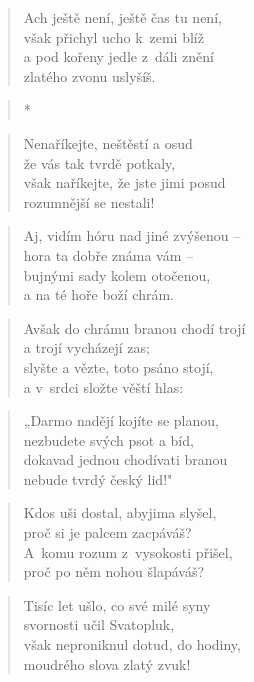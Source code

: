 \begin{verse}
Ach ještě není, ještě čas tu není, \\
však přichyl ucho k~zemi blíž \\
a pod kořeny jedle z~dáli znění \\
zlatého zvonu uslyšíš.
\end{verse}

\begin{verse}
*
\end{verse}

\begin{verse}
Nenaříkejte, neštěstí a osud \\
že vás tak tvrdě potkaly, \\
však naříkejte, že jste jimi posud \\
rozumnější se nestali!
\end{verse}

\begin{verse}
Aj, vidím hóru nad jiné zvýšenou -- \\
hora ta dobře známa vám -- \\
bujnými sady kolem otočenou, \\
a na té hoře boží chrám.
\end{verse}

\begin{verse}
Avšak do chrámu branou chodí trojí \\
a trojí vycházejí zas; \\
slyšte a vězte, toto psáno stojí, \\
a v~srdci složte věští hlas:
\end{verse}

\begin{verse}
„Darmo nadějí kojíte se planou, \\
nezbudete svých psot a bíd, \\
dokavad jednou chodívati branou \\
nebude tvrdý český lid!"
\end{verse}

\begin{verse}
Kdos uši dostal, abyjima slyšel, \\
proč si je palcem zacpáváš? \\
A~komu rozum z~vysokosti přišel, \\
proč po něm nohou šlapáváš?
\end{verse}

\begin{verse}
Tisíc let ušlo, co své milé syny \\
svornosti učil Svatopluk, \\
však neproniknul dotud, do hodiny, \\
moudrého slova zlatý zvuk!
\end{verse}

